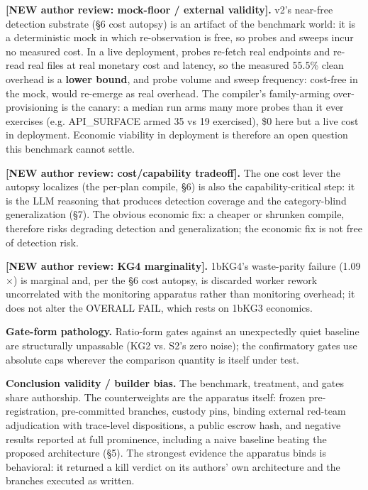 \documentclass[acmsmall,screen,review,anonymous]{acmart}
\renewenvironment{leftbar}{%
  \def\FrameCommand{\hspace{2pt}{\color{lbcol}\vrule width 1.5pt}\hspace{8pt}}%
  \MakeFramed{\advance\hsize-\width \FrameRestore}\small}%
  {\endMakeFramed}
\begin{document}
\begin{leftbar}
\textbf{[NEW \textperiodcentered{} author review: mock-floor / external validity].} v2's near-free detection substrate (\S6 cost autopsy) is an artifact of the benchmark world: it is a deterministic mock in which re-observation is free, so probes and sweeps incur no measured cost. In a live deployment, probes re-fetch real endpoints and re-read real files at real monetary cost and latency, so the measured 55.5\% clean overhead is a \textbf{lower bound}, and probe volume and sweep frequency: cost-free in the mock, would re-emerge as real overhead. The compiler's family-arming over-provisioning is the canary: a median run arms many more probes than it ever exercises (e.g. API\_SURFACE armed 35 vs 19 exercised), \$0 here but a live cost in deployment. Economic viability in deployment is therefore an open question this benchmark cannot settle.

\textbf{[NEW \textperiodcentered{} author review: cost/capability tradeoff].} The one cost lever the autopsy localizes (the per-plan compile, \S6) is also the capability-critical step: it is the LLM reasoning that produces detection coverage and the category-blind generalization (\S7). The obvious economic fix: a cheaper or shrunken compile, therefore risks degrading detection and generalization; the economic fix is not free of detection risk.

\textbf{[NEW \textperiodcentered{} author review: KG4 marginality].} 1bKG4's waste-parity failure (1.09$\times$) is marginal and, per the \S6 cost autopsy, is discarded worker rework uncorrelated with the monitoring apparatus rather than monitoring overhead; it does not alter the OVERALL FAIL, which rests on 1bKG3 economics.

\end{leftbar}
\textbf{Gate-form pathology.} Ratio-form gates against an unexpectedly quiet baseline are structurally unpassable (KG2 vs. S2's zero noise); the confirmatory gates use absolute caps wherever the comparison quantity is itself under test.

\textbf{Conclusion validity / builder bias.} The benchmark, treatment, and gates share authorship. The counterweights are the apparatus itself: frozen pre-registration, pre-committed branches, custody pins, binding external red-team adjudication with trace-level dispositions, a public escrow hash, and negative results reported at full prominence, including a naive baseline beating the proposed architecture (\S5). The strongest evidence the apparatus binds is behavioral: it returned a kill verdict on its authors' own architecture and the branches executed as written.
\end{document}

